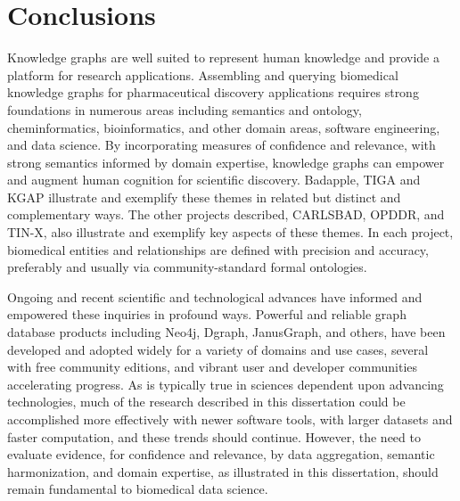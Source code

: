 \chapter{Conclusions}

Knowledge graphs are well suited to represent human knowledge and provide a platform for research applications.  Assembling and querying biomedical knowledge graphs for pharmaceutical discovery applications requires strong foundations in numerous areas including semantics and ontology, cheminformatics, bioinformatics, and other domain areas, software engineering, and data science. By incorporating measures of confidence and relevance, with strong semantics informed by domain expertise, knowledge graphs can empower and augment human cognition for scientific discovery. Badapple, TIGA and KGAP illustrate and exemplify these themes in related but distinct and complementary ways. The other projects described, CARLSBAD, OPDDR, and TIN-X, also illustrate and exemplify key aspects of these themes. In each project, biomedical entities and relationships are defined with precision and accuracy, preferably and usually via community-standard formal ontologies.

Ongoing and recent scientific and technological advances have informed and empowered these inquiries in profound ways. Powerful and reliable graph database products including Neo4j, Dgraph, JanusGraph, and others, have been developed and adopted widely for a variety of domains and use cases, several with free community editions, and vibrant user and developer communities accelerating progress. As is typically true in sciences dependent upon advancing technologies, much of the research described in this dissertation could be accomplished more effectively with newer software tools, with larger datasets and faster computation, and these trends should continue. However, the need to evaluate evidence, for confidence and relevance, by data aggregation, semantic harmonization, and domain expertise, as illustrated in this dissertation, should remain fundamental to biomedical data science.
